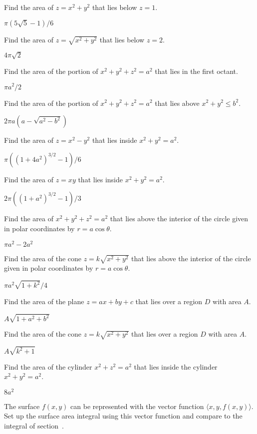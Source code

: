 \begin{exercises}
\exercise Find the area of $z=x^2+y^2$ that lies below $z=1$.
\begin{answer} $\pi(5\sqrt5-1)/6$
\end{answer}

\exercise Find the area of $z=\sqrt{x^2+y^2}$ that lies below $z=2$.
\begin{answer} $4\pi\sqrt2$
\end{answer}

\exercise Find the area of the portion of $x^2+y^2+z^2=a^2$ that lies
in the first octant.
\begin{answer} $\pi a^2/2$
\end{answer}

\exercise Find the area of the portion of $x^2+y^2+z^2=a^2$ that lies
above $x^2+y^2\le b^2$.
\begin{answer} $2\pi a(a-\sqrt{a^2-b^2})$
\end{answer}

\exercise Find the area of $z=x^2-y^2$ that lies inside $x^2+y^2=a^2$.
\begin{answer} $\pi((1+4a^2)^{3/2}-1)/6$
\end{answer}

\exercise Find the area of $z=xy$ that lies inside $x^2+y^2=a^2$.
\begin{answer} $2\pi((1+a^2)^{3/2}-1)/3$
\end{answer}

\exercise Find the area of $x^2+y^2+z^2=a^2$ 
that lies above the interior of the circle given in polar coordinates
by $r=a\cos \theta$.
\begin{answer} $\pi a^2-2a^2$
\end{answer}

\exercise Find the area of the cone $z=k\sqrt{x^2+y^2}$
that lies above the interior of the circle given in polar coordinates
by $r=a\cos \theta$.
\begin{answer} $\pi a^2\sqrt{1+k^2}/4$
\end{answer}

\exercise Find the area of the plane $z=ax+by+c$ that lies over a
region $D$ with area $A$.
\begin{answer} $A\sqrt{1+a^2+b^2}$
\end{answer}

\exercise Find the area of the cone $z=k\sqrt{x^2+y^2}$ that lies over a
region $D$ with area $A$.
\begin{answer} $A\sqrt{k^2+1}$
\end{answer}

\exercise Find the area of the cylinder $x^2+z^2=a^2$ that lies inside
the cylinder $x^2+y^2=a^2$.
\begin{answer} $8a^2$
\end{answer}

\exercise The surface $f(x,y)$ can be represented with the vector
function $\langle x,y,f(x,y)\rangle$. Set up the surface area integral using
this vector function and compare to the integral of
section~. 

\end{exercises}

